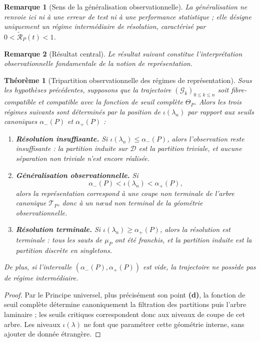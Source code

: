 \documentclass[11pt,a4paper]{article}
\newtheorem{theorem}{Théorème}
\newtheorem{remark}{Remarque}
\begin{document}
\begin{appendices}
\begin{remark}[Sens de la généralisation observationnelle]
La généralisation ne renvoie ici ni à une erreur de test ni à une performance statistique ; elle désigne uniquement un régime intermédiaire de résolution, caractérisé par \(0<\widetilde{\mathcal R}_P(t)<1\).
\end{remark}

\begin{remark}[Résultat central]
Le résultat suivant constitue l'interprétation observationnelle fondamentale de la notion de représentation.
\end{remark}

\begin{theorem}[Tripartition observationnelle des régimes de représentation]
\label{thm:tripartition-representation}
Sous les hypothèses précédentes, supposons que la trajectoire \((\mathcal G_k)_{0\le k\le n}\) soit fibre-compatible et compatible avec la fonction de seuil complète \(\Theta_P\). Alors les trois régimes suivants sont déterminés par la position de \(\iota(\lambda_n)\) par rapport aux seuils canoniques \(\alpha_-(P)\) et \(\alpha_+(P)\) :

\begin{enumerate}[label=\textbf{(\arabic*)}]
\item \textbf{Résolution insuffisante.} Si \(\iota(\lambda_n)\le \alpha_-(P)\), alors l'observation reste insuffisante : la partition induite sur \(\mathcal D\) est la partition triviale, et aucune séparation non triviale n'est encore réalisée.

\item \textbf{Généralisation observationnelle.} Si
\[
\alpha_-(P)< \iota(\lambda_n)< \alpha_+(P),
\]
alors la représentation correspond à une coupe non terminale de l'arbre canonique \(\mathcal T_P\), donc à un nœud non terminal de la géométrie observationnelle.

\item \textbf{Résolution terminale.} Si \(\iota(\lambda_n)\ge \alpha_+(P)\), alors la résolution est terminale : tous les sauts de \(\mu_P\) ont été franchis, et la partition induite est la partition discrète en singletons.
\end{enumerate}

De plus, si l'intervalle \((\alpha_-(P),\alpha_+(P))\) est vide, la trajectoire ne possède pas de régime intermédiaire.
\end{theorem}

\begin{proof}
Par le Principe universel, plus précisément son point \textbf{(d)}, la fonction de seuil complète détermine canoniquement la filtration des partitions puis l'arbre laminaire ; les seuils critiques correspondent donc aux niveaux de coupe de cet arbre. Les niveaux \(\iota(\lambda)\) ne font que paramétrer cette géométrie interne, sans ajouter de donnée étrangère.


\end{proof}
\end{appendices}
\end{document}
